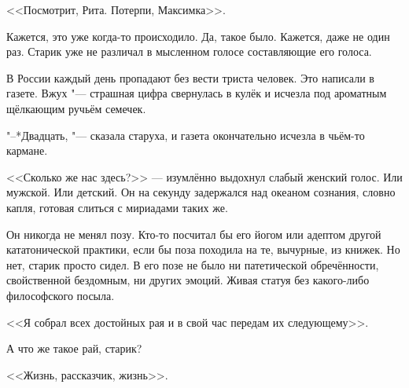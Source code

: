 \documentclass[a4paper,10pt,fleqn]{book}
\begin{document}
<<Посмотрит, Рита.
Потерпи, Максимка>>.

Кажется, это уже когда-то происходило.
Да, такое было.
Кажется, даже не один раз.
Старик уже не различал в мысленном голосе составляющие его голоса.

В России каждый день пропадают без вести триста человек.
Это написали в газете.
Вжух "--- страшная цифра свернулась в кулёк и исчезла под ароматным щёлкающим ручьём семечек.

"--*Двадцать, "--- сказала старуха, и газета окончательно исчезла в чьём-то кармане.

<<Сколько же нас здесь?>> --- изумлённо выдохнул слабый женский голос.
Или мужской.
Или детский.
Он на секунду задержался над океаном сознания, словно капля, готовая слиться с мириадами таких же.

Он никогда не менял позу.
Кто-то посчитал бы его йогом или адептом другой кататонической практики, если бы поза походила на те, вычурные, из книжек.
Но нет, старик просто сидел.
В его позе не было ни патетической обречённости, свойственной бездомным, ни других эмоций.
Живая статуя без какого-либо философского посыла.

<<Я собрал всех достойных рая и в свой час передам их следующему>>.

А что же такое рай, старик?

<<Жизнь, рассказчик, жизнь>>.
\end{document}

